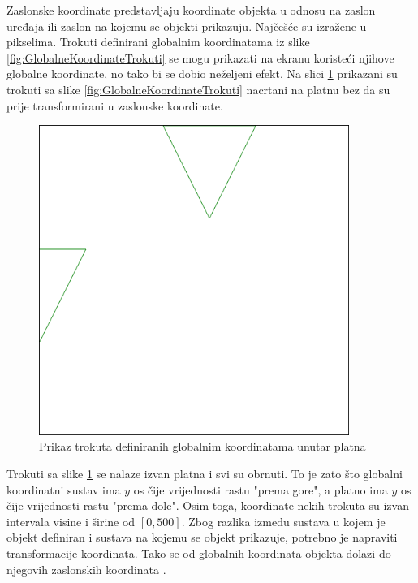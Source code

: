 \documentclass{foi}
\begin{document}
Zaslonske koordinate predstavljaju koordinate objekta u odnosu na zaslon uređaja ili zaslon na kojemu se objekti prikazuju. Najčešće su izražene u pikselima. Trokuti definirani globalnim koordinatama iz slike \ref{fig:GlobalneKoordinateTrokuti} se mogu prikazati na ekranu koristeći njihove globalne koordinate, no tako bi se dobio neželjeni efekt. Na slici \ref{fig:ZaslonskeKoordinateCanvas} prikazani su trokuti sa slike \ref{fig:GlobalneKoordinateTrokuti} nacrtani na platnu bez da su prije transformirani u zaslonske koordinate. 
\begin{figure}[H]
    \centering
    \includegraphics[width=0.9\textwidth]{slike/4_ZaslonskeKoordinateCanvas.png}
    \captionsetup{justification=centering}
    \caption{Prikaz trokuta definiranih globalnim koordinatama unutar platna}
\label{fig:ZaslonskeKoordinateCanvas}
\end{figure}

Trokuti sa slike \ref{fig:ZaslonskeKoordinateCanvas} se nalaze izvan platna i svi su obrnuti. To je zato što globalni koordinatni sustav ima $y$ os čije vrijednosti rastu "prema gore", a platno ima $y$ os čije vrijednosti rastu "prema dole". Osim toga, koordinate nekih trokuta su izvan intervala visine i širine od $[0, 500]$. Zbog razlika između sustava u kojem je objekt definiran i sustava na kojemu se objekt prikazuje, potrebno je napraviti transformacije koordinata. Tako se od globalnih koordinata objekta dolazi do njegovih zaslonskih koordinata \parencite{MediumCoords2023}.
\end{document}
